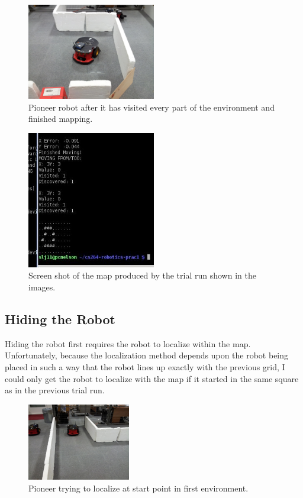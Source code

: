 \documentclass{article}
\begin{document}
\begin{figure}[H]
\centering
\includegraphics[width=0.5\textwidth]{img/robot_pics/20130416_133043.jpg}
\caption{Pioneer robot after it has visited every part of the environment and finished mapping.}
\label{fig:robot-map-finished}
\end{figure}

\begin{figure}[H]
\centering
\includegraphics[width=0.5\textwidth]{img/robot_pics/run1_example.jpg}
\caption{Screen shot of the map produced by the trial run shown in the images.}
\label{fig:robot-map-run1}
\end{figure}

\subsection{Hiding the Robot}
Hiding the robot first requires the robot to localize within the map. Unfortunately, because the localization method depends upon the robot being placed in such a way that the robot lines up exactly with the previous grid, I could only get the robot to localize with the map if it started in the same square as in the previous trial run.

\begin{figure}[H]
\centering
\includegraphics[width=0.4\textwidth]{img/robot_pics/20130416_132228.jpg}
\caption{Pioneer trying to localize at start point in first environment.}
\label{fig:robot-map-localize1-image}
\end{figure}
\end{document}
